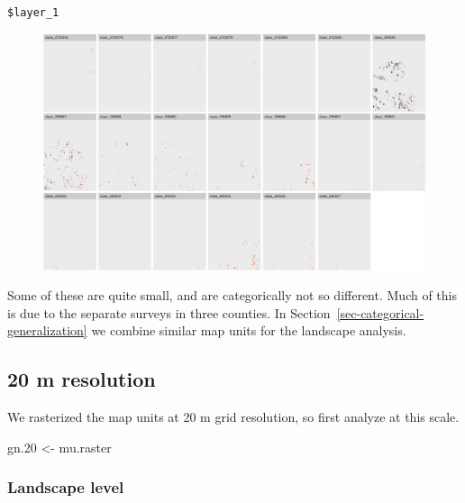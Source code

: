 \documentclass[
  letterpaper,
  DIV=11,
  numbers=noendperiod]{scrartcl}
\newenvironment{Shaded}{\begin{snugshade}}{\end{snugshade}}
\newcommand{\FloatTok}[1]{\textcolor[rgb]{0.68,0.00,0.00}{#1}}
\newcommand{\NormalTok}[1]{\textcolor[rgb]{0.00,0.23,0.31}{#1}}
\newcommand{\OtherTok}[1]{\textcolor[rgb]{0.00,0.23,0.31}{#1}}
\begin{document}
\begin{verbatim}
$layer_1
\end{verbatim}

\begin{figure}[H]

{\centering \includegraphics{PatternAnalysisWorkshopTutorial_files/figure-pdf/show.landscape.gn-3.pdf}

}

\end{figure}

Some of these are quite small, and are categorically not so different.
Much of this is due to the separate surveys in three counties. In
Section~\ref{sec-categorical-generalization} we combine similar map
units for the landscape analysis.

\hypertarget{m-resolution}{%
\subsection{20 m resolution}\label{m-resolution}}

We rasterized the map units at 20 m grid resolution, so first analyze at
this scale.

\begin{Shaded}
\begin{Highlighting}[]
\NormalTok{gn}\FloatTok{.20} \OtherTok{\textless{}{-}}\NormalTok{ mu.raster}
\end{Highlighting}
\end{Shaded}

\hypertarget{landscape-level}{%
\subsubsection{Landscape level}\label{landscape-level}}
\end{document}

